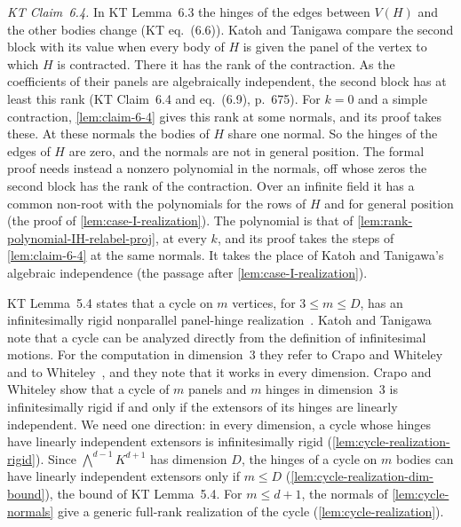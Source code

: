 \begin{remark}
  \emph{KT Claim~6.4.} In KT Lemma~6.3 the hinges of the edges between
  $V(H)$ and the other bodies change (KT eq.~(6.6)). Katoh and Tanigawa
  compare the second block with its value when every body of $H$ is
  given the panel of the vertex to which $H$ is contracted. There it has
  the rank of the contraction. As the coefficients of their panels are
  algebraically independent, the second block has at least this rank
  (KT Claim~6.4 and eq.~(6.9), p.~675). For $k = 0$ and a simple
  contraction, \cref{lem:claim-6-4} gives this rank at some normals,
  and its proof takes these. At these normals the bodies of $H$ share
  one normal. So the hinges of the edges of $H$ are zero, and the
  normals are not in general position. The formal proof needs instead a
  nonzero polynomial in the normals, off whose zeros the second block
  has the rank of the contraction. Over an infinite field it has a
  common non-root with the polynomials for the rows of $H$ and for
  general position (the proof of \cref{lem:case-I-realization}). The
  polynomial is that of \cref{lem:rank-polynomial-IH-relabel-proj}, at
  every $k$, and its proof takes the steps of \cref{lem:claim-6-4} at the
  same normals. It takes the place of Katoh and Tanigawa's algebraic
  independence (the passage after \cref{lem:case-I-realization}).
\end{remark}

KT Lemma~5.4 states that a cycle on $m$ vertices, for $3 \le m \le D$,
has an infinitesimally rigid nonparallel panel-hinge
realization~\cite[p.~670]{katohTanigawa2011}. Katoh and Tanigawa note
that a cycle can be analyzed directly from the definition of
infinitesimal motions. For the computation in dimension~$3$ they refer
to Crapo and Whiteley~\cite[Proposition~3.4]{crapoWhiteley1982} and to
Whiteley~\cite[Proposition~3]{whiteley1999}, and they note that it
works in every dimension. Crapo and Whiteley show that a cycle of $m$
panels and $m$ hinges in dimension~$3$ is infinitesimally rigid if and
only if the extensors of its hinges are linearly independent. We need
one direction: in every dimension, a cycle whose hinges have linearly
independent extensors is infinitesimally rigid
(\cref{lem:cycle-realization-rigid}). Since $\bigwedge^{d-1} K^{d+1}$
has dimension $D$, the hinges of a cycle on $m$ bodies can have linearly
independent extensors only if $m \le D$
(\cref{lem:cycle-realization-dim-bound}), the bound of KT Lemma~5.4.
For $m \le d + 1$, the normals of \cref{lem:cycle-normals} give a
generic full-rank realization of the cycle
(\cref{lem:cycle-realization}).

